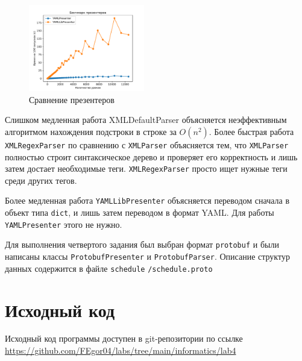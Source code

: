\begin{figure}[ht]
    \centering
    \includegraphics[width=0.45\textwidth]{img/benchmark_p.pdf}
    \caption{Сравнение презентеров}
    \label{fig:presenters}
\end{figure}

Слишком медленная работа XMLDefaultParser объясняется неэффективным алгоритмом нахождения подстроки в строке за $O(n^2)$.
Более быстрая работа \texttt{XMLRegexParser} по сравнению с \texttt{XMLParser} объясняется тем, что \texttt{XMLParser} полностью строит синтаксическое дерево
и проверяет его корректность и лишь затем достает необходимые теги. \texttt{XMLRegexParser} просто ищет нужные теги среди других тегов.

Более медленная работа \texttt{YAMLLibPresenter} объясняется переводом сначала в объект типа \texttt{dict}, и лишь затем переводом в формат YAML.
Для работы \texttt{YAMLPresenter} этого не нужно.

Для выполнения четвертого задания был выбран формат \texttt{protobuf} и были написаны классы \texttt{ProtobufPresenter} и \texttt{ProtobufParser}.
Описание структур данных содержится в файле \texttt{schedule} \texttt{/schedule.proto}

\section{Исходный код}
Исходный код программы доступен в git-репозитории по ссылке \url{https://github.com/FEgor04/labs/tree/main/informatics/lab4}
